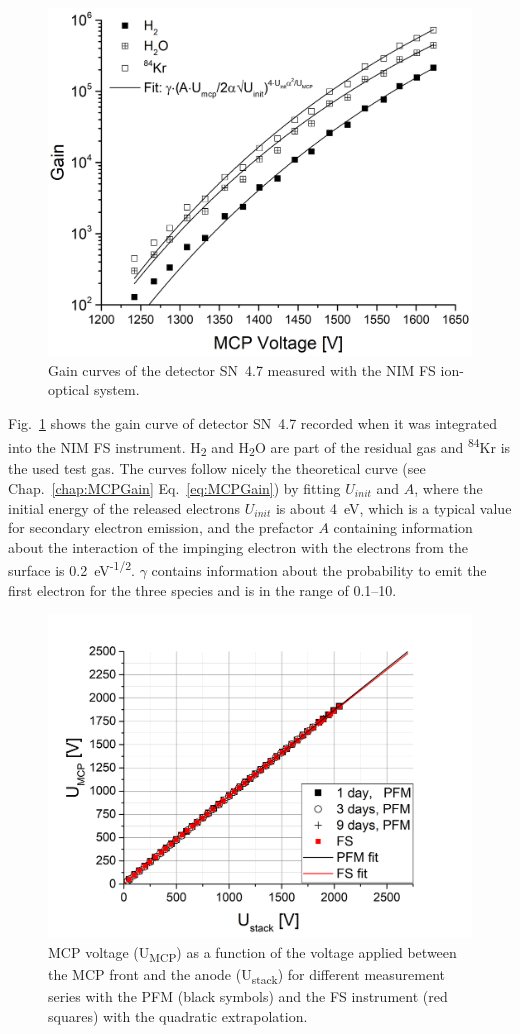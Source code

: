 	\begin{figure}[h!] %
		\centering
		\includegraphics[width=.7\textwidth]{Experiments/GainDetFSLabEl.png}
		\caption{Gain curves of the detector SN~4.7 measured with the NIM FS ion-optical system.}
		\label{fig:MCPGainCurve4p7}
	\end{figure}
	Fig.~\ref{fig:MCPGainCurve4p7} shows the gain curve of detector SN~4.7 recorded when it was integrated into the NIM FS instrument. H\textsubscript{2} and H\textsubscript{2}O are part of the residual gas and \textsuperscript{84}Kr is the used test gas. The curves follow nicely the theoretical curve (see Chap.~\ref{chap:MCPGain} Eq.~\eqref{eq:MCPGain}) by fitting $U_{init}$ and $A$, where the initial energy of the released electrons $U_{init}$ is about 4~eV, which is a typical value for secondary electron emission, and the prefactor $A$ containing information about the interaction of the impinging electron with the electrons from the surface is 0.2~eV\textsuperscript{-1/2}. $\gamma$ contains information about the probability to emit the first electron for the three species and is in the range of 0.1--10.\\
	\begin{figure}[H] %
		\centering
		\includegraphics[width=.8\textwidth]{Experiments/PFM_UstackUmccp_TimeEvol.png}
		\caption{MCP voltage (U\textsubscript{MCP}) as a function of the voltage applied between the MCP front and the anode (U\textsubscript{stack}) for different measurement series with the PFM (black symbols) and the FS instrument (red squares) with the quadratic extrapolation.}
		\label{fig:PFMUstackUmcpTimeEvol}
	\end{figure}
